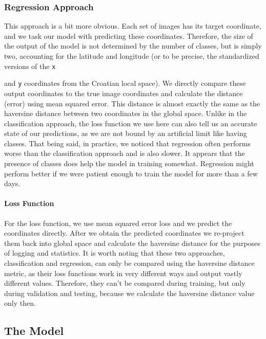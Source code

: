 \documentclass[]{article}
\let\oldparagraph\paragraph
\renewcommand{\paragraph}[1]{\oldparagraph{#1}\mbox{}}
\let\oldtexttt\texttt
\renewcommand{\texttt}[1]{
  \textcolor{tcolor}{\colorbox{bgcolor}{\oldtexttt{#1}}}
}
\begin{document}
\hypertarget{regression-approach}{%
\subsubsection{Regression Approach}\label{regression-approach}}

This approach is a bit more obvious. Each set of images has its target
coordinate, and we task our model with predicting these coordinates.
Therefore, the size of the output of the model is not determined by the
number of classes, but is simply two, accounting for the latitude and
longitude (or to be precise, the standardized versions of the \texttt{x}
and \texttt{y} coordinates from the Croatian local space). We directly
compare these output coordinates to the true image coordinates and
calculate the distance (error) using mean squared error. This distance
is almost exactly the same as the haversine distance between two
coordinates in the global space. Unlike in the classification approach,
the loss function we use here can also tell us an accurate state of our
predictions, as we are not bound by an artificial limit like having
classes. That being said, in practice, we noticed that regression often
performs worse than the classification approach and is also slower. It
appears that the presence of classes does help the model in training
somewhat. Regression might perform better if we were patient enough to
train the model for more than a few days.

\hypertarget{loss-function-1}{%
\paragraph{Loss Function}\label{loss-function-1}}

For the loss function, we use mean squared error loss and we predict the
coordinates directly. After we obtain the predicted coordinates we
re-project them back into global space and calculate the haversine
distance for the purposes of logging and statistics. It is worth noting
that these two approaches, classification and regression, can only be
compared using the haversine distance metric, as their loss functions
work in very different ways and output vastly different values.
Therefore, they can't be compared during training, but only during
validation and testing, because we calculate the haversine distance
value only then.

\hypertarget{the-model}{%
\subsection{The Model}\label{the-model}}
\end{document}
